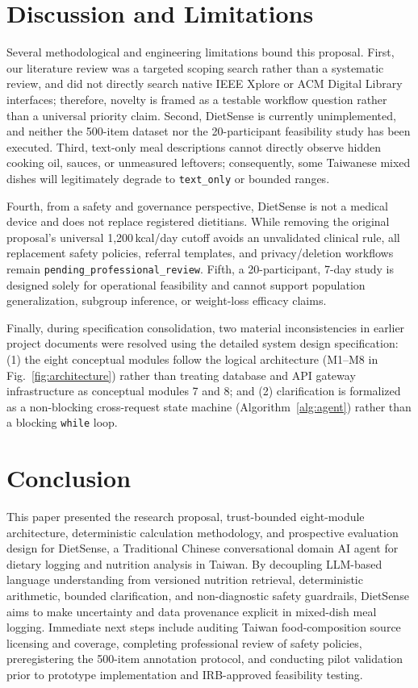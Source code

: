 \documentclass[conference]{IEEEtran}
\begin{document}
\section{Discussion and Limitations}
Several methodological and engineering limitations bound this proposal. First, our literature review was a targeted scoping search rather than a systematic review, and did not directly search native IEEE Xplore or ACM Digital Library interfaces; therefore, novelty is framed as a testable workflow question rather than a universal priority claim. Second, DietSense is currently unimplemented, and neither the 500-item dataset nor the 20-participant feasibility study has been executed. Third, text-only meal descriptions cannot directly observe hidden cooking oil, sauces, or unmeasured leftovers; consequently, some Taiwanese mixed dishes will legitimately degrade to \texttt{text\_only} or bounded ranges.

Fourth, from a safety and governance perspective, DietSense is not a medical device and does not replace registered dietitians. While removing the original proposal's universal 1,200\,kcal/day cutoff avoids an unvalidated clinical rule, all replacement safety policies, referral templates, and privacy/deletion workflows remain \texttt{pending\_professional\_review}. Fifth, a 20-participant, 7-day study is designed solely for operational feasibility and cannot support population generalization, subgroup inference, or weight-loss efficacy claims.

Finally, during specification consolidation, two material inconsistencies in earlier project documents were resolved using the detailed system design specification: (1) the eight conceptual modules follow the logical architecture (M1--M8 in Fig.~\ref{fig:architecture}) rather than treating database and API gateway infrastructure as conceptual modules 7 and 8; and (2) clarification is formalized as a non-blocking cross-request state machine (Algorithm~\ref{alg:agent}) rather than a blocking \texttt{while} loop.

\section{Conclusion}
This paper presented the research proposal, trust-bounded eight-module architecture, deterministic calculation methodology, and prospective evaluation design for DietSense, a Traditional Chinese conversational domain AI agent for dietary logging and nutrition analysis in Taiwan. By decoupling LLM-based language understanding from versioned nutrition retrieval, deterministic arithmetic, bounded clarification, and non-diagnostic safety guardrails, DietSense aims to make uncertainty and data provenance explicit in mixed-dish meal logging. Immediate next steps include auditing Taiwan food-composition source licensing and coverage, completing professional review of safety policies, preregistering the 500-item annotation protocol, and conducting pilot validation prior to prototype implementation and IRB-approved feasibility testing.



\end{document}
